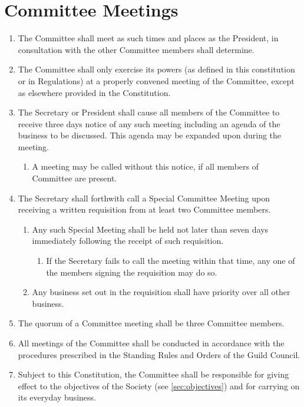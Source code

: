 \documentclass[a4paper]{article}
\begin{document}
\section{Committee Meetings}
\begin{enumerate}
    \item The Committee shall meet as such times and places as the President, in consultation with the other Committee members shall determine.
    \item The Committee shall only exercise its powers (as defined in this constitution or in Regulations) at a properly convened meeting of the Committee, except as elsewhere provided in the Constitution.
    \item The Secretary or President shall cause all members of the Committee to receive three days notice of any such meeting including an agenda of the business to be discussed. This agenda may be expanded upon during the meeting.
    \begin{enumerate}
        \item A meeting may be called without this notice, if all members of Committee are present.
    \end{enumerate}
    \item The Secretary shall forthwith call a Special Committee Meeting upon receiving a written requisition from at least two Committee members.
    \begin{enumerate}
        \item Any such Special Meeting shall be held not later than seven days immediately following the receipt of such requisition.
        \begin{enumerate}
            \item If the Secretary fails to call the meeting within that time, any one of the members signing the requisition may do so. 
        \end{enumerate}
        \item Any business set out in the requisition shall have priority over all other business.
    \end{enumerate}
    \item The quorum of a Committee meeting shall be three Committee members.
    \item All meetings of the Committee shall be conducted in accordance with the procedures prescribed in the Standing Rules and Orders of the Guild Council.
    \item Subject to this Constitution, the Committee shall be responsible for giving effect to the objectives of the Society (see \cref{sec:objectives}) and for carrying on its everyday business.

\end{enumerate}
\end{document}
